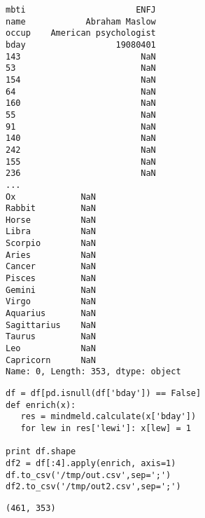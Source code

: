 \documentclass[12pt,fleqn]{article}\usepackage{common}
\begin{document}
\begin{verbatim}
mbti                      ENFJ
name            Abraham Maslow
occup    American psychologist
bday                  19080401
143                        NaN
53                         NaN
154                        NaN
64                         NaN
160                        NaN
55                         NaN
91                         NaN
140                        NaN
242                        NaN
155                        NaN
236                        NaN
...
Ox             NaN
Rabbit         NaN
Horse          NaN
Libra          NaN
Scorpio        NaN
Aries          NaN
Cancer         NaN
Pisces         NaN
Gemini         NaN
Virgo          NaN
Aquarius       NaN
Sagittarius    NaN
Taurus         NaN
Leo            NaN
Capricorn      NaN
Name: 0, Length: 353, dtype: object
\end{verbatim}

\begin{verbatim}
df = df[pd.isnull(df['bday']) == False]
def enrich(x):
   res = mindmeld.calculate(x['bday'])
   for lew in res['lewi']: x[lew] = 1

print df.shape
df2 = df[:4].apply(enrich, axis=1)
df.to_csv('/tmp/out.csv',sep=';')
df2.to_csv('/tmp/out2.csv',sep=';')
\end{verbatim}

\begin{verbatim}
(461, 353)
\end{verbatim}
\end{document}
